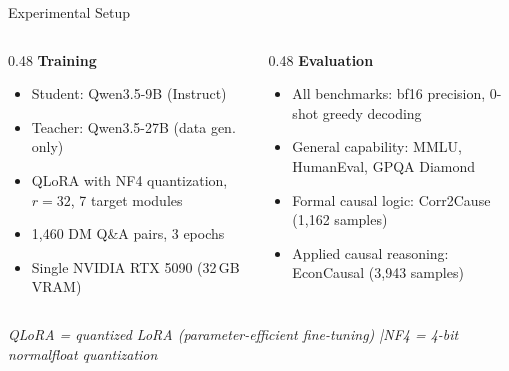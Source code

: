 \documentclass[aspectratio=169,12pt]{beamer}
\begin{document}
\begin{frame}{Experimental Setup}
  \begin{columns}[T]
    \begin{column}{0.48\textwidth}
      \textbf{Training}
      \begin{itemize}
        \item Student: Qwen3.5-9B (Instruct)
        \item Teacher: Qwen3.5-27B (data gen. only)
        \item QLoRA with NF4 quantization, $r\!=\!32$, 7 target modules
        \item 1,460 DM Q\&A pairs, 3 epochs
        \item Single NVIDIA RTX 5090 (32\,GB VRAM)
      \end{itemize}
    \end{column}
    \begin{column}{0.48\textwidth}
      \textbf{Evaluation}
      \begin{itemize}
        \item All benchmarks: bf16 precision, 0-shot greedy decoding
        \item General capability: MMLU, HumanEval, GPQA Diamond
        \item Formal causal logic: Corr2Cause (1,162 samples)
        \item Applied causal reasoning: EconCausal (3,943 samples)
      \end{itemize}
    \end{column}
  \end{columns}

  \vspace{0.3em}
  \small\textit{QLoRA = quantized LoRA (parameter-efficient fine-tuning) \quad|\quad NF4 = 4-bit normalfloat quantization}

\end{frame}
\end{document}
